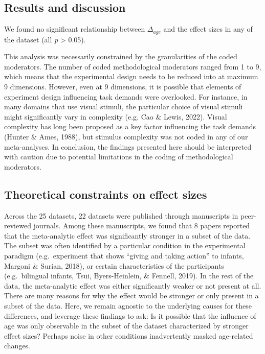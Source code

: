 \documentclass[
  man]{apa6}
\begin{document}
\hypertarget{results-and-discussion-1}{%
\subsection{Results and discussion}\label{results-and-discussion-1}}

We found no significant relationship between \(\Delta_{age}\) and the effect sizes in any of the dataset (all \emph{p} \textgreater{} 0.05).

This analysis was necessarily constrained by the granularities of the coded moderators. The number of coded methodological moderators ranged from 1 to 9, which means that the experimental design needs to be reduced into at maximum 9 dimensions. However, even at 9 dimensions, it is possible that elements of experiment design influencing task demands were overlooked. For instance, in many domains that use visual stimuli, the particular choice of visual stimuli might significantly vary in complexity (e.g. Cao \& Lewis, 2022). Visual complexity has long been proposed as a key factor influencing the task demands (Hunter \& Ames, 1988), but stimulus complexity was not coded in any of our meta-analyses. In conclusion, the findings presented here should be interpreted with caution due to potential limitations in the coding of methodological moderators.

\hypertarget{theoretical-constraints-on-effect-sizes}{%
\subsection{Theoretical constraints on effect sizes}\label{theoretical-constraints-on-effect-sizes}}

Across the 25 datasets, 22 datasets were published through manuscripts in peer-reviewed journals. Among these manuscripts, we found that 8 papers reported that the meta-analytic effect was significantly stronger in a subset of the data. The subset was often identified by a particular condition in the experimental paradigm (e.g.~experiment that shows ``giving and taking action'' to infants, Margoni \& Surian, 2018), or certain characteristics of the participants (e.g.~bilingual infants, Tsui, Byers-Heinlein, \& Fennell, 2019). In the rest of the data, the meta-analytic effect was either significantly weaker or not present at all. There are many reasons for why the effect would be stronger or only present in a subset of the data. Here, we remain agnostic to the underlying causes for these differences, and leverage these findings to ask: Is it possible that the influence of age was only observable in the subset of the dataset characterized by stronger effect sizes? Perhaps noise in other conditions inadvertently masked age-related changes.
\end{document}
